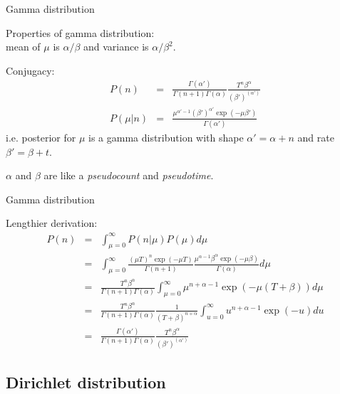 \documentclass{beamer}
\begin{document}
\begin{frame}{Gamma distribution}

\itemb
 \item Properties of gamma distribution: \\ mean of $\mu$ is $\alpha/\beta$ and variance is $\alpha/\beta^2$.
 \item Conjugacy:
\begin{eqnarray*}
P(n) & = & \frac{\Gamma(\alpha')}{\Gamma(n+1)\Gamma(\alpha)} \frac{T^n \beta^\alpha}{(\beta')^{(\alpha')}} \\
P(\mu|n) & = & \frac{\mu^{\alpha'-1} (\beta')^{\alpha'} \exp(-\mu \beta')}{\Gamma(\alpha')}
\end{eqnarray*}
i.e. posterior for $\mu$ is a gamma distribution with shape $\alpha' = \alpha + n$ and rate $\beta' = \beta + t$.
\item $\alpha$ and $\beta$ are like a {\em pseudocount} and {\em pseudotime}.
\iteme


\end{frame}


\begin{frame}{Gamma distribution}

\itemb
 \item Lengthier derivation:
\begin{eqnarray*}
P(n) & = & \int_{\mu=0}^\infty P(n|\mu) P(\mu) d\mu \\
& = & \int_{\mu=0}^\infty \frac{(\mu T)^n \exp(-\mu T)}{\Gamma(n+1)} \frac{\mu^{\alpha-1} \beta^\alpha \exp(-\mu \beta)}{\Gamma(\alpha)} d\mu \\
& = & \frac{T^n \beta^\alpha}{\Gamma(n+1)\Gamma(\alpha)} \int_{\mu=0}^\infty \mu^{n+\alpha-1} \exp(-\mu (T+\beta)) d\mu \\
& = & \frac{T^n \beta^\alpha}{\Gamma(n+1)\Gamma(\alpha)} \frac{1}{(T+\beta)^{n+\alpha}} \int_{u=0}^\infty u^{n+\alpha-1} \exp(-u) du \\
& = & \frac{\Gamma(\alpha')}{\Gamma(n+1)\Gamma(\alpha)} \frac{T^n \beta^\alpha}{(\beta')^{(\alpha')}}
\end{eqnarray*}
\iteme

\end{frame}

\subsection{Dirichlet distribution}
\end{document}
